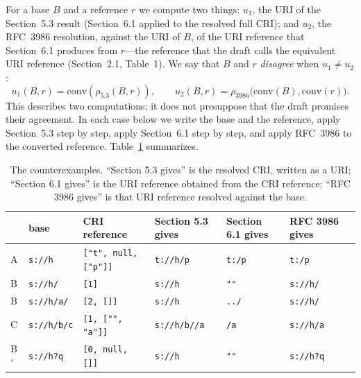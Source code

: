 \documentclass[11pt,a4paper]{article}
\theoremstyle{remark}
\newcommand{\cri}[1]{\texttt{#1}}
\newcommand{\uri}[1]{\texttt{#1}}
\newcommand{\res}{\rho_{5.3}}
\newcommand{\rfc}{\rho_{3986}}
\newcommand{\conv}{\mathrm{conv}}
\begin{document}
For a base $B$ and a reference $r$ we compute two things: $u_1$, the URI of the Section~5.3 result
(Section~6.1 applied to the resolved full CRI); and $u_2$, the RFC~3986 resolution, against the URI of
$B$, of the URI reference that Section~6.1 produces from $r$---the reference that the draft calls the
equivalent URI reference (Section~2.1, Table~1). We say that $B$ and $r$ \emph{disagree} when
$u_1\neq u_2$:
\[
u_1(B,r)=\conv(\res(B,r)),\qquad u_2(B,r)=\rfc\bigl(\conv(B),\conv(r)\bigr).
\] This describes two computations; it does not presuppose that the draft promises their
agreement. In each case below we write the base and the reference, apply Section~5.3 step by step, apply
Section~6.1 step by step, and apply RFC~3986 to the converted reference. Table~\ref{tab:cex} summarizes.

\begin{table}[ht]
\centering\small
\begin{tabular}{lllllll}
\toprule
 & base & CRI reference & Section 5.3 gives & Section 6.1 gives & RFC 3986 gives\\
\midrule
A & \cri{s://h} & \cri{["t", null, ["p"]]} & \cri{t://h/p} & \uri{t:/p} & \uri{t:/p}\\
B & \cri{s://h/} & \cri{[1]} & \cri{s://h} & \uri{""} & \uri{s://h/}\\
B & \cri{s://h/a/} & \cri{[2, []]} & \cri{s://h} & \uri{../} & \uri{s://h/}\\
C & \cri{s://h/b/c} & \cri{[1, ["", "a"]]} & \cri{s://h/b//a} & \uri{/a} & \uri{s://h/a}\\
B$'$ & \cri{s://h?q} & \cri{[0, null, []]} & \cri{s://h} & \uri{""} & \uri{s://h?q}\\
\bottomrule
\end{tabular}
\caption{The counterexamples. ``Section 5.3 gives'' is the resolved CRI, written as a URI; ``Section 6.1 gives'' is the
URI reference obtained from the CRI reference; ``RFC 3986 gives'' is that URI reference resolved against the base.}
\label{tab:cex}
\end{table}
\end{document}
